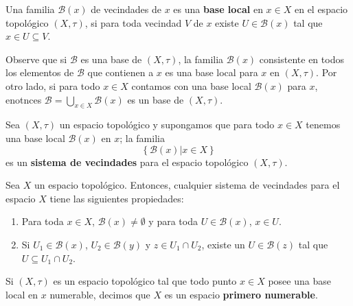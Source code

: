 \documentclass[12pt]{report}
\theoremstyle{largebreak}
\newcommand{\eul}[1]{\ensuremath{\mathscr{#1}}}
\renewcommand{\theenumi}{\arabic{enumi})}
\begin{document}
    \begin{mydef}
        Una familia $\eul{B}(x)$ de vecindades de $x$ es una \textbf{base local} en $x\in X$ en el espacio topológico $(X,\tau)$, si para toda vecindad $V$ de $x$ existe $U\in\eul{B}(x)$ tal que $x\in U\subseteq V$.
    \end{mydef}

    Observe que si $\eul{B}$ es una base de $(X,\tau)$, la familia $\eul{B}(x)$ consistente en todos los elementos de $\eul{B}$ que contienen a $x$ es una base local para $x$ en $(X,\tau)$. Por otro lado, si para todo $x\in X$ contamos con una base local $\eul{B}(x)$ para $x$, enotnces $\eul{B}=\bigcup_{x\in X}\eul{B}(x)$ es un base de $(X,\tau)$.

    \begin{mydef}
        Sea $(X,\tau)$ un espacio topológico y supongamos que para todo $x\in X$ tenemos una base local $\eul{B}(x)$ en $x$; la familia
        \begin{equation*}
            \left\{\eul{B}(x) \big| x\in X \right\}
        \end{equation*}
        es un \textbf{sistema de vecindades} para el espacio topológico $(X,\tau)$.
    \end{mydef}

    \begin{propo}
        Sea $X$ un espacio topológico. Entonces, cualquier sistema de vecindades para el espacio $X$ tiene las siguientes propiedades:
        \renewcommand{\theenumi}{BP\arabic{enumi})}
        \begin{enumerate}
            \item Para toda $x\in X$, $\eul{B}(x)\neq\emptyset$ y para toda $U\in\eul{B}(x)$, $x\in U$.
            \item Si $U_1\in\eul{B}(x)$, $U_2\in\eul{B}(y)$ y $z\in U_1\cap U_2$, existe un $U\in \eul{B}(z)$ tal que $U\subseteq U_1\cap U_2$.
        \end{enumerate}
        \renewcommand{\theenumi}{B\arabic{enumi})}
    \end{propo}

    \begin{mydef}
        Si $(X,\tau)$ es un espacio topológico tal que todo punto $x\in X$ posee una base local en $x$ numerable, decimos que $X$ es un espacio \textbf{primero numerable}. 
    \end{mydef}
\end{document}
